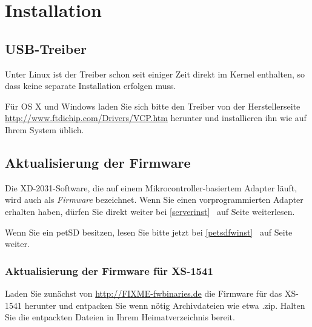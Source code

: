 \documentclass[10pt,a4paper]{scrartcl}		%
\newcommand{\fwbinaries}{http://FIXME-fwbinaries.de}
\begin{document}
\section{Installation}
\subsection{USB-Treiber}
Unter Linux ist der Treiber schon seit einiger Zeit direkt im Kernel
enthalten, so dass keine separate Installation erfolgen muss.

Für OS X und Windows laden Sie sich bitte den Treiber von der
Herstellerseite \url{http://www.ftdichip.com/Drivers/VCP.htm} 
herunter und installieren ihn wie auf Ihrem System üblich.

\subsection{Aktualisierung der Firmware}
Die XD-2031-Software, die auf einem Mikrocontroller-basiertem Adapter
läuft, wird auch als \textit{Firmware} bezeichnet.
Wenn Sie einen vorprogrammierten Adapter erhalten haben,
dürfen Sie direkt weiter bei \glqq\ref{serverinst} 
\grqq\ auf Seite \pageref{serverinst}  weiterlesen.

Wenn Sie ein petSD besitzen, lesen Sie bitte jetzt bei
\glqq\ref{petsdfwinst} \grqq\ auf Seite
\pageref{petsdfwinst} weiter.

\subsubsection{Aktualisierung der Firmware für XS-1541}
Laden Sie zunächst von \url{\fwbinaries} die Firmware für das XS-1541
herunter und entpacken Sie wenn nötig Archivdateien wie etwa \glqq .zip\grqq . 
Halten Sie die entpackten Dateien in Ihrem Heimatverzeichnis bereit.
\end{document}
